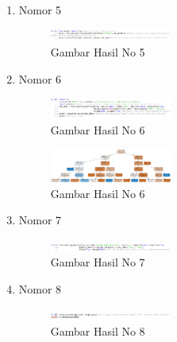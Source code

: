 \begin{enumerate}
\item Nomor 5
	\hfill\break
	
	
\begin{figure}[H]
	\includegraphics[width=4cm]{figures/1174062/2/ScikitLearn/Nomor 5.png}
	\centering
	\caption{Gambar Hasil No 5 }
\end{figure}
	
\item Nomor 6
	\hfill\break
	
	
\begin{figure}[H]
	\includegraphics[width=4cm]{figures/1174062/2/ScikitLearn/Nomor 6.png}
	\centering
	\caption{Gambar Hasil No 6}
\end{figure}
	
\begin{figure}[H]
	\includegraphics[width=4cm]{figures/1174062/2/ScikitLearn/6.png}
	\centering
	\caption{Gambar Hasil No 6 }
\end{figure}
	
\item Nomor 7
	\hfill\break
	
	
\begin{figure}[H]
	\includegraphics[width=4cm]{figures/1174062/2/ScikitLearn/Nomor 7.png}
	\centering
	\caption{Gambar Hasil No 7 }
\end{figure}
	
\item Nomor 8
	\hfill\break
	
	
\begin{figure}[H]
	\includegraphics[width=4cm]{figures/1174062/2/ScikitLearn/Nomor 8.png}
	\centering
	\caption{Gambar Hasil No 8 }
\end{figure}
	

\end{enumerate}
